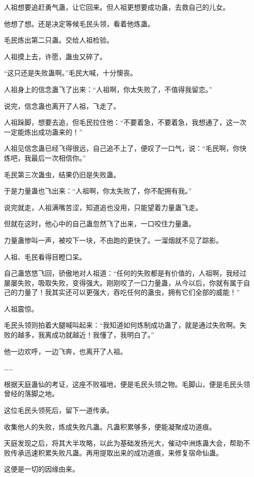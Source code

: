 \begin{this_body}
人祖想要追赶勇气蛊，让它回来。但人祖更想要成功蛊，去救自己的儿女。

他想了想。还是决定等候毛民头领，看着他炼蛊。

毛民炼出第二只蛊。交给人祖检验。

人祖摸上去，许愿，蛊虫又碎了。

“这只还是失败蛊啊。”毛民大喊，十分懊丧。

人祖身上的信念蛊飞了出来：“人祖啊，你太失败了，不值得我留恋。”

说完，信念蛊也离开了人祖，飞走了。

人祖跺脚，想要去追，但毛民拉住他：“不要着急，不要着急，我想通了，这一次一定能炼出成功蛊来的！”

人祖见信念蛊已经飞得很远，自己追不上了，便叹了一口气，说：“毛民啊，你快炼吧，我最后一次相信你。”

毛民第三次蛊虫，结果仍旧是失败蛊。

于是力量蛊也飞出来：“人祖啊，你太失败了，你不配拥有我。”

说完就走，人祖满嘴苦涩，知道追也没用，只能望着力量蛊飞走。

但就在这时，他心中的自己蛊忽然飞了出来，一口咬住力量蛊。

力量蛊惨叫一声，被咬下一块，不由跑的更快了。一溜烟就不见了踪影。

人祖、毛民看得目瞪口呆。

自己蛊悠悠飞回，骄傲地对人祖道：“任何的失败都是有价值的，人祖啊，我经过屡屡失败，吸取失败，变得强大。刚刚咬了一口力量蛊，从今以后，你就有属于自己的力量了！我其实还可以更强大，吞吃任何的蛊虫，拥有它们全部的威能！”

人祖震惊。

毛民头领则拍着大腿喊叫起来：“我知道如何炼制成功蛊了，就是通过失败啊。失败的越多，我离成功就越近！我懂了，我明白了。”

他一边欢呼，一边飞奔，也离开了人祖。

……

根据天庭蛊仙的考证，这座不败福地，便是毛民头领之物。毛脚山，便是毛民头领曾经的落脚之地。

这位毛民头领死后，留下一道传承。

收集他人的失败，炼成失败凡蛊。凡蛊积累够多，便能凝聚成功道痕。

天庭发现之后，将其大半攻略，以此为基础发扬光大，催动中洲炼蛊大会，帮助不败传承迅速积累失败凡蛊。再用提取出来的成功道痕，来修复宿命仙蛊。

这便是一切的因缘由来。

\end{this_body}

